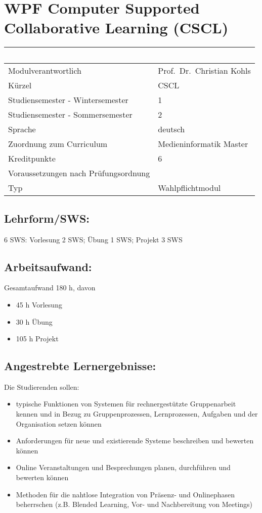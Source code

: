 \chapter{WPF Computer Supported Collaborative Learning
(CSCL)}\label{wpf-computer-supported-collaborative-learning-cscl}

\begin{longtable}[]{@{}ll@{}}
\toprule
~ & ~\tabularnewline
\midrule
\endhead
Modulverantwortlich & Prof.~Dr.~Christian Kohls\tabularnewline
Kürzel & CSCL\tabularnewline
Studiensemester - Wintersemester & 1\tabularnewline
Studiensemester - Sommersemester & 2\tabularnewline
Sprache & deutsch\tabularnewline
Zuordnung zum Curriculum & Medieninformatik Master\tabularnewline
Kreditpunkte & 6\tabularnewline
Voraussetzungen nach Prüfungsordnung &\tabularnewline
Typ & Wahlpflichtmodul\tabularnewline
\bottomrule
\end{longtable}

\section*{Lehrform/SWS:}\label{lehrformsws-19}

6 SWS: Vorlesung 2 SWS; Übung 1 SWS; Projekt 3 SWS

\section*{Arbeitsaufwand:}\label{arbeitsaufwand-19}

Gesamtaufwand 180 h, davon

\begin{itemize}
\item
  45 h Vorlesung
\item
  30 h Übung
\item
  105 h Projekt
\end{itemize}

\section*{Angestrebte
Lernergebnisse:}\label{angestrebte-lernergebnisse-19}

Die Studierenden sollen:

\begin{itemize}
\item
  typische Funktionen von Systemen für rechnergestützte Gruppenarbeit
  kennen und in Bezug zu Gruppenprozessen, Lernprozessen, Aufgaben und
  der Organisation setzen können
\item
  Anforderungen für neue und existierende Systeme beschreiben und
  bewerten können
\item
  Online Veranstaltungen und Besprechungen planen, durchführen und
  bewerten können
\item
  Methoden für die nahtlose Integration von Präsenz- und Onlinephasen
  beherrschen (z.B. Blended Learning, Vor- und Nachbereitung von
  Meetings)
\end{itemize}

